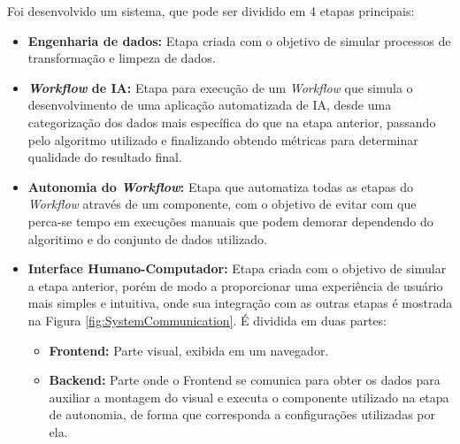 \documentclass[posterIC]{a0poster}
\begin{document}
\begin{multicols}{2}
Foi desenvolvido um sistema, que pode ser dividido em 4 etapas principais: 

\begin{itemize}
    \item {\textbf{Engenharia de dados:}} Etapa criada com o objetivo de simular processos de transformação e limpeza de dados.
    \item {\textbf{\textit{Workflow} de IA:}} Etapa para execução de um \textit{Workflow} que simula o desenvolvimento de uma aplicação automatizada de IA, desde uma categorização dos dados mais específica do que na etapa anterior, passando pelo algoritmo utilizado e finalizando obtendo métricas para determinar qualidade do resultado final.
    \item {\textbf{Autonomia do \textit{Workflow}:}} Etapa que automatiza todas as etapas do \textit{Workflow} através de um componente, com o objetivo de evitar com que perca-se tempo em execuções manuais que podem demorar dependendo do algoritimo e do conjunto de dados utilizado.
    \item {\textbf{Interface Humano-Computador:}} Etapa criada com o objetivo de simular a etapa anterior, porém de modo a proporcionar uma experiência de usuário mais simples e intuitiva, onde sua integração com as outras etapas é mostrada na Figura \ref{fig:SystemCommunication}. É dividida em duas partes:
    \begin{itemize}
        \item {\textbf{Frontend:}} Parte visual, exibida em um navegador.
        \item {\textbf{Backend:}} Parte onde o Frontend se comunica para obter os dados para auxiliar a montagem do visual e executa o componente utilizado na etapa de autonomia, de forma que corresponda a configurações utilizadas por ela.
    \end{itemize}
\end{itemize}


\end{multicols}
\end{document}

